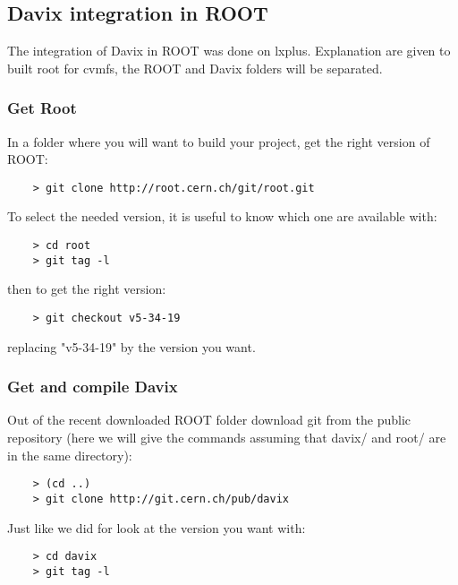 
\subsection{Davix integration in ROOT}

The integration of Davix in ROOT was done on lxplus. Explanation are given to built root for cvmfs, the ROOT and Davix folders will be separated.\\

\subsubsection{Get Root}

In a folder where you will want to build your project, get the right version of ROOT:

\begin{lstlisting}
	> git clone http://root.cern.ch/git/root.git
\end{lstlisting}

To select the needed version, it is useful to know which one are available with:

\begin{lstlisting}
	> cd root
	> git tag -l
\end{lstlisting}

then to get the right version:

\begin{lstlisting}
	> git checkout v5-34-19
\end{lstlisting}

replacing "v5-34-19" by the version you want.


\subsubsection{Get and compile Davix}

Out of the recent downloaded ROOT folder download git from the public repository (here we will give the commands assuming that davix/ and root/ are in the same directory):

\begin{lstlisting}
	> (cd ..)
	> git clone http://git.cern.ch/pub/davix
\end{lstlisting}

Just like we did for look at the version you want with:


\begin{lstlisting}
	> cd davix
	> git tag -l
\end{lstlisting}

